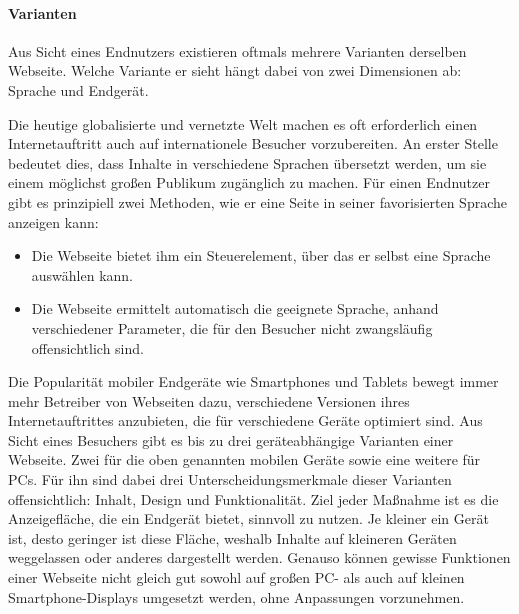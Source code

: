         \paragraph{Varianten}
        Aus Sicht eines Endnutzers existieren oftmals mehrere
        Varianten derselben Webseite.
        Welche Variante er sieht hängt dabei von zwei Dimensionen ab:
        Sprache und Endgerät.

        Die heutige globalisierte und vernetzte Welt machen es oft erforderlich
        einen Internetauftritt auch auf internationele Besucher vorzubereiten.
        An erster Stelle bedeutet dies, dass Inhalte in verschiedene Sprachen
        übersetzt werden, um sie einem möglichst großen Publikum zugänglich zu machen.
        Für einen Endnutzer gibt es prinzipiell zwei Methoden,
        wie er eine Seite in seiner favorisierten Sprache anzeigen kann:

        \begin{itemize}
            \item   Die Webseite bietet ihm ein Steuerelement,
                    über das er selbst eine Sprache auswählen kann.
            \item   Die Webseite ermittelt automatisch die geeignete Sprache,
                    anhand verschiedener Parameter, die für den Besucher nicht zwangsläufig
                    offensichtlich sind.
        \end{itemize}

        Die Popularität mobiler Endgeräte wie Smartphones und Tablets
        bewegt immer mehr Betreiber von Webseiten dazu,
        verschiedene Versionen ihres Internetauftrittes anzubieten,
        die für verschiedene Geräte optimiert sind.
        Aus Sicht eines Besuchers gibt es bis zu drei geräteabhängige
        Varianten einer Webseite. Zwei für die oben genannten mobilen Geräte
        sowie eine weitere für PCs.
        Für ihn sind dabei drei Unterscheidungsmerkmale dieser Varianten offensichtlich:
        Inhalt, Design und Funktionalität.
        Ziel jeder Maßnahme ist es die Anzeigefläche,
        die ein Endgerät bietet, sinnvoll zu nutzen.
        Je kleiner ein Gerät ist, desto geringer ist diese Fläche,
        weshalb Inhalte auf kleineren Geräten weggelassen oder anderes
        dargestellt werden.
        Genauso können gewisse Funktionen einer Webseite nicht gleich
        gut sowohl auf großen PC- als auch auf kleinen Smartphone-Displays
        umgesetzt werden, ohne Anpassungen vorzunehmen.
        

